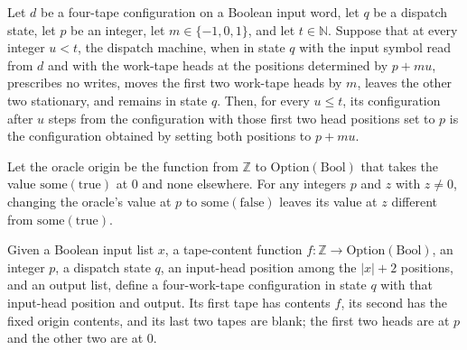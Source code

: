 \begin{theorem}
\label{Turing.oracleWalk_run}
\leanok
{}
Let $d$ be a four-tape configuration on a Boolean input word, let $q$ be a dispatch
state, let $p$ be an integer, let $m\in\{-1,0,1\}$, and let $t\in\mathbb{N}$. Suppose
that at every integer $u<t$, the dispatch machine, when in state $q$ with the input
symbol read from $d$ and with the work-tape heads at the positions determined by $p+mu$,
prescribes no writes, moves the first two work-tape heads by $m$, leaves the other two
stationary, and remains in state $q$. Then, for every $u\le t$, its configuration after
$u$ steps from the configuration with those first two head positions set to $p$ is the
configuration obtained by setting both positions to $p+mu$.
\end{theorem}

\begin{theorem}
\label{Turing.oracleBookmark_ne_origin}
\leanok
{}
Let the oracle origin be the function from $\mathbb{Z}$ to
$\mathrm{Option}(\mathrm{Bool})$ that takes the value $\mathrm{some}(\mathrm{true})$ at
$0$ and $\mathrm{none}$ elsewhere. For any integers $p$ and $z$ with $z \ne 0$, changing
the oracle's value at $p$ to $\mathrm{some}(\mathrm{false})$ leaves its value at $z$
different from $\mathrm{some}(\mathrm{true})$.
\end{theorem}

\begin{definition}
\label{Turing.oracleLocalCfg}
\leanok
{}
Given a Boolean input list $x$, a tape-content function $f:\mathbb
Z\to\mathrm{Option}(\mathrm{Bool})$, an integer $p$, a dispatch state $q$, an input-head
position among the $|x|+2$ positions, and an output list, define a four-work-tape
configuration in state $q$ with that input-head position and output. Its first tape has
contents $f$, its second has the fixed origin contents, and its last two tapes are
blank; the first two heads are at $p$ and the other two are at $0$.
\end{definition}

